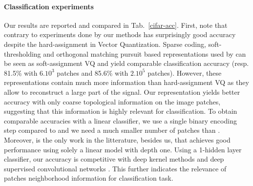 \documentclass{article}
\begin{document}
\paragraph{Classification experiments} Our results are reported and compared in Tab.~\ref{cifar-acc}. First, note that contrary to experiments done by \cite{coates2011analysis} our methods has surprisingly good accuracy despite the hard-assignment in Vector Quantization.
Sparse coding, soft-thresholding and orthogonal matching pursuit based representations used by \cite{coates2011importance, recht2019imagenet} can be seen as soft-assignment VQ and yield comparable classification accuracy (resp. 81.5\% with $6.10^3$ patches and 85.6\% with $2.10^5$ patches).
However, these representations contain much more information than hard-assignment VQ as they allow to reconstruct a large part of the signal.
Our representation yields better accuracy with only coarse topological information on the image patches, suggesting that this information is highly relevant for classification.
To obtain comparable accuracies with a linear classifier, we use a single binary encoding step compared to \cite{mairal2016end} and we need a much smaller number of patches than \cite{recht2019imagenet, coates2011importance}.
Moreover, \cite{recht2019imagenet} is the only work in the litterature, besides us, that achieves good performance using solely a linear model with depth one. 
Using a 1-hidden layer classifier, our accuracy is competitive with deep kernel methods \citep{li2019enhanced,shankar2020neural} and deep supervised convolutional networks \citep{krizhevsky2012imagenet}.
This further indicates the relevance of patches neighborhood information for classification task.
\end{document}
